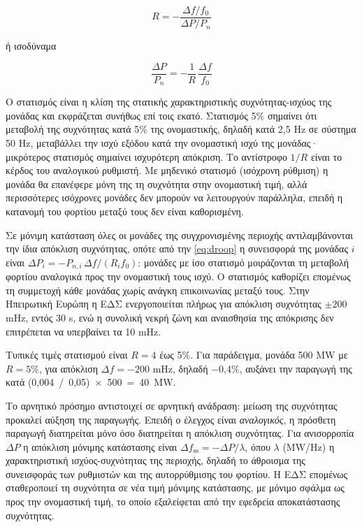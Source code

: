 \begin{equation}
R = -\frac{\Delta f / f_0}{\Delta P / P_n}
\label{eq:droopdef}
\end{equation}

ή ισοδύναμα

\begin{equation}
\frac{\Delta P}{P_n} = -\frac{1}{R}\,\frac{\Delta f}{f_0}
\label{eq:droop}
\end{equation}

Ο στατισμός είναι η κλίση της στατικής χαρακτηριστικής συχνότητας-ισχύος της μονάδας και
εκφράζεται συνήθως επί τοις εκατό. Στατισμός 5\% σημαίνει ότι μεταβολή της συχνότητας κατά 5\%
της ονομαστικής, δηλαδή κατά 2,5 Hz σε σύστημα 50 Hz, μεταβάλλει την ισχύ εξόδου κατά την
ονομαστική ισχύ της μονάδας· μικρότερος στατισμός σημαίνει ισχυρότερη απόκριση. Το αντίστροφο
$1/R$ είναι το κέρδος του αναλογικού ρυθμιστή. Με μηδενικό στατισμό (ισόχρονη ρύθμιση) η
μονάδα θα επανέφερε μόνη της τη συχνότητα στην ονομαστική τιμή, αλλά περισσότερες ισόχρονες
μονάδες δεν μπορούν να λειτουργούν παράλληλα, επειδή η κατανομή του φορτίου μεταξύ τους δεν
είναι καθορισμένη.

Σε μόνιμη κατάσταση όλες οι μονάδες της συγχρονισμένης περιοχής αντιλαμβάνονται την ίδια
απόκλιση συχνότητας, οπότε από την \eqref{eq:droop} η συνεισφορά της μονάδας $i$ είναι
$\Delta P_i = -P_{n,i}\,\Delta f / (R_i f_0)$: μονάδες με ίσο στατισμό μοιράζονται τη
μεταβολή φορτίου αναλογικά προς την ονομαστική τους ισχύ. Ο στατισμός καθορίζει επομένως τη
συμμετοχή κάθε μονάδας χωρίς ανάγκη επικοινωνίας μεταξύ τους. Στην Ηπειρωτική Ευρώπη η ΕΔΣ
ενεργοποιείται πλήρως για απόκλιση συχνότητας $\pm 200$ mHz, εντός 30 s, ενώ η συνολική νεκρή
ζώνη και αναισθησία της απόκρισης δεν επιτρέπεται να υπερβαίνει τα 10 mHz.

Τυπικές τιμές στατισμού είναι $R = 4$ έως 5\%. Για παράδειγμα, μονάδα 500 MW με $R = 5\%$,
για απόκλιση $\Delta f = -200$ mHz, δηλαδή −0,4\%, αυξάνει την παραγωγή της κατά
(0,004~/~0,05)~×~500~=~40~MW.

Το αρνητικό πρόσημο αντιστοιχεί σε αρνητική ανάδραση: μείωση της συχνότητας προκαλεί αύξηση
της παραγωγής. Επειδή ο έλεγχος είναι \emph{αναλογικός}, η πρόσθετη παραγωγή διατηρείται μόνο
όσο διατηρείται η απόκλιση συχνότητας. Για ανισορροπία $\Delta P$ η απόκλιση μόνιμης
κατάστασης είναι $\Delta f_{\mathrm{ss}} = -\Delta P / \lambda$, όπου $\lambda$ (MW/Hz) η
χαρακτηριστική ισχύος-συχνότητας της περιοχής, δηλαδή το άθροισμα της συνεισφοράς των
ρυθμιστών και της αυτορρύθμισης του φορτίου. Η ΕΔΣ επομένως σταθεροποιεί τη συχνότητα σε
νέα τιμή μόνιμης κατάστασης, με μόνιμο σφάλμα ως προς την ονομαστική τιμή, το οποίο
εξαλείφεται από την εφεδρεία αποκατάστασης συχνότητας.


